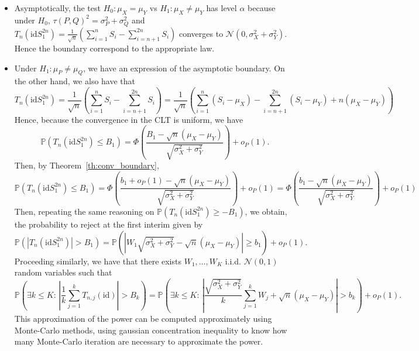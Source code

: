 \documentclass{article}
\theoremstyle{plain}
\theoremstyle{remark}
\renewcommand{\P}{\mathbb{P}}
\newcommand{\1}{\mathbbm{1}}
\numberwithin{equation}{section}
\begin{document}
\begin{itemize}
 \item Asymptotically, the test $H_0:\mu_X = \mu_Y$ vs $H_1:\mu_X \neq \mu_Y$ has level $\alpha$ because under $H_0$, $\tau(P,Q)^2=\sigma_P^2+\sigma_Q^2$ and $T_n(\mathrm{id} S_1^{2n})=\frac{1}{\sqrt{n}}\left(\sum_{i=1}^n S_i - \sum_{i=n+1}^{2n} S_i\right)$ converges to $\mathcal{N}(0,\sigma_X^2+\sigma_Y^2)$. Hence the boundary correspond to the appropriate law.
 \item Under $H_1:\mu_P \neq \mu_Q$, we have an expression of the asymptotic boundary. On the other hand, we also have that
$$T_n(\mathrm{id}S_1^{2n}) =\frac{1}{\sqrt{n}}\left(\sum_{i=1}^n S_i - \sum_{i=n+1}^{2n} S_i\right) = \frac{1}{\sqrt{n}}\left(\sum_{i=1}^n (S_i-\mu_X) - \sum_{i=n+1}^{2n} (S_i-\mu_Y)   + n (\mu_X-\mu_Y)\right)$$
Hence, because the convergence in the CLT is uniform, we have
$$\P\left( T_n(\mathrm{id}S_1^{2n}) \le B_1\right) = \Phi\left(\frac{B_1-\sqrt{n}(\mu_X-\mu_Y)}{\sqrt{\sigma_X^2+\sigma_Y^2}}\right) + o_P(1).$$
Then, by Theorem~\ref{th:conv_boundary},
$$\P\left( T_n(\mathrm{id}S_1^{2n}) \le B_1\right) = \Phi\left(\frac{b_1+o_P(1)-\sqrt{n}(\mu_X-\mu_Y)}{\sqrt{\sigma_X^2+\sigma_Y^2}}\right) + o_P(1) =\Phi\left(\frac{b_1-\sqrt{n}(\mu_X-\mu_Y)}{\sqrt{\sigma_X^2+\sigma_Y^2}}\right) + o_P(1)$$
Then, repeating the same reasoning on $\P\left( T_n(\mathrm{id}S_1^{2n}) \ge - B_1\right)$, we obtain, the probability to reject at the first interim given by
$$\P\left( |T_n(\mathrm{id}S_1^{2n})| > B_1\right) = \P\left( \left|W_1\sqrt{\sigma_X^2+\sigma_Y^2}-\sqrt{n}(\mu_X-\mu_Y)\right|\ge b_1\right) + o_P(1).$$
Proceeding similarly, we have that there exists $W_1,\dots,W_K$ i.i.d. $\mathcal{N}(0,1)$ random variables such that
$$\P\left( \exists k \le K:\, \left|\frac{1}{k}\sum_{j=1}^k T_{n,j}(\mathrm{id})\right| > B_k\right) =\P\left( \exists k \le K:\, \left|\frac{\sqrt{\sigma_X^2+\sigma_Y^2}}{k}\sum_{j=1}^kW_j + \sqrt{n}(\mu_X-\mu_Y)\right| > b_k\right) + o_P(1).$$
This approximation of the power can be computed approximately using Monte-Carlo methods, using gaussian concentration inequality to know how many Monte-Carlo iteration are necessary to approximate the power.

\end{itemize}
\end{document}
